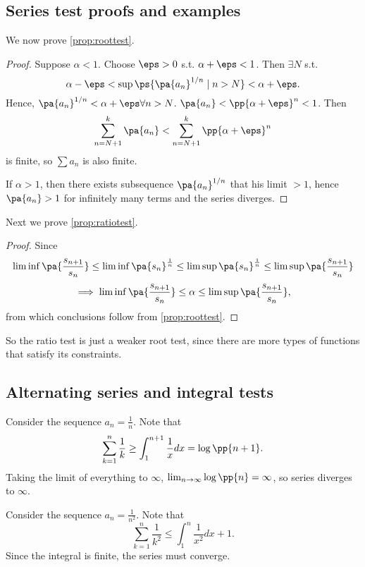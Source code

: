 \documentclass[11pt]{scrartcl}
\numberwithin{equation}{section}
\begin{document}
\subsection{Series test proofs and examples}
We now prove \cref{prop:roottest}.
\begin{proof}
    Suppose $\alpha<1$. Choose $\eps>0$ s.t. $\alpha+\eps < 1$.
    Then $\exists N$ s.t.  
    \[ \alpha-\eps < \sup\ps{\pa{a_n}^{1/n}\mid n > N} < 
    \alpha + \eps. \]
    Hence, $\pa{a_n}^{1/n} < \alpha+\eps \forall n > N$.
    $\pa{a_n} < \pp{\alpha+\eps}^n < 1$. Then 
    \[ \sum_{n=N+1}^{k}\pa{a_n} < \sum_{n=N+1}^{k}\pp{\alpha+\eps}^n\]
    is finite, so $\sum a_n$ is also finite.
    
    If $\alpha>1$, then there exists subsequence 
    $\pa{a_n}^{1/n}$ that his limit $>1$,
    hence $\pa{a_n} > 1$ for infinitely many terms and the series diverges.
\end{proof}
Next we prove \cref{prop:ratiotest}.
\begin{proof}
    Since 
    \[ \liminf \pa{\frac{s_{n+1}}{s_n}} \leq \liminf \pa{s_n}^{\frac{1}{n}}
    \leq \limsup \pa{s_n}^{\frac{1}{n}}\leq \limsup \pa{\frac{s_{n+1}}{s_n}}\]
    \[ \implies\liminf \pa{\frac{s_{n+1}}{s_n}} \leq \alpha\leq \limsup \pa{\frac{s_{n+1}}{s_n}},\]
    from which conclusions follow from \cref{prop:roottest}.
\end{proof}

So the ratio test is just a weaker root test, since there are more types of 
functions that satisfy its constraints.

\subsection{Alternating series and integral tests}

\begin{example}
    Consider the sequence $a_n = \frac{1}{n}$. Note that
    \[ \sum_{k=1}^{n}\frac{1}{k} \geq \int_{1}^{n+1}\frac{1}{x}dx = \log\pp{n+1}.\] 
    Taking the limit of everything to $\infty$, 
    $\lim_{n\rightarrow \infty}{\log\pp{n}} = \infty$,
    so series diverges to $\infty$.
\end{example}

\begin{example}
    Consider the sequence $a_n = \frac{1}{n^2}$. Note that
    \[ \sum_{k=1}^{n}\frac{1}{k^2} \leq \int_{1}^{n}\frac{1}{x^2}dx + 1.\]
    Since the integral is finite, the series must converge.
\end{example}
\end{document}
